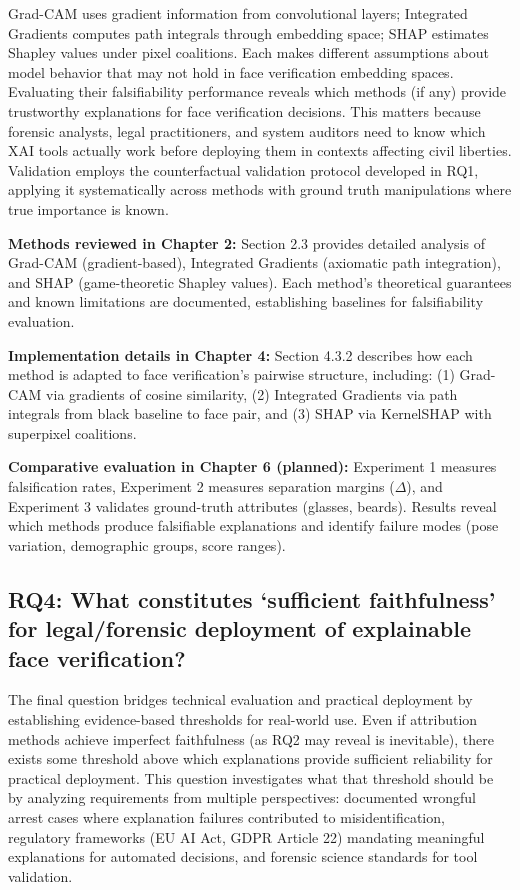 Grad-CAM uses gradient information from convolutional layers; Integrated Gradients computes path integrals through embedding space; SHAP estimates Shapley values under pixel coalitions. Each makes different assumptions about model behavior that may not hold in face verification embedding spaces. Evaluating their falsifiability performance reveals which methods (if any) provide trustworthy explanations for face verification decisions. This matters because forensic analysts, legal practitioners, and system auditors need to know which XAI tools actually work before deploying them in contexts affecting civil liberties. Validation employs the counterfactual validation protocol developed in RQ1, applying it systematically across methods with ground truth manipulations where true importance is known.

\vspace{0.3cm}
\noindent\textbf{Methods reviewed in Chapter 2:} Section 2.3 provides detailed analysis of Grad-CAM (gradient-based), Integrated Gradients (axiomatic path integration), and SHAP (game-theoretic Shapley values). Each method's theoretical guarantees and known limitations are documented, establishing baselines for falsifiability evaluation.

\vspace{0.3cm}
\noindent\textbf{Implementation details in Chapter 4:} Section 4.3.2 describes how each method is adapted to face verification's pairwise structure, including: (1) Grad-CAM via gradients of cosine similarity, (2) Integrated Gradients via path integrals from black baseline to face pair, and (3) SHAP via KernelSHAP with superpixel coalitions.

\vspace{0.3cm}
\noindent\textbf{Comparative evaluation in Chapter 6 (planned):} Experiment 1 measures falsification rates, Experiment 2 measures separation margins ($\Delta$), and Experiment 3 validates ground-truth attributes (glasses, beards). Results reveal which methods produce falsifiable explanations and identify failure modes (pose variation, demographic groups, score ranges).

\subsection*{RQ4: What constitutes `sufficient faithfulness' for legal/forensic deployment of explainable face verification?}

The final question bridges technical evaluation and practical deployment by establishing evidence-based thresholds for real-world use. Even if attribution methods achieve imperfect faithfulness (as RQ2 may reveal is inevitable), there exists some threshold above which explanations provide sufficient reliability for practical deployment. This question investigates what that threshold should be by analyzing requirements from multiple perspectives: documented wrongful arrest cases where explanation failures contributed to misidentification, regulatory frameworks (EU AI Act, GDPR Article 22) mandating meaningful explanations for automated decisions, and forensic science standards for tool validation.

